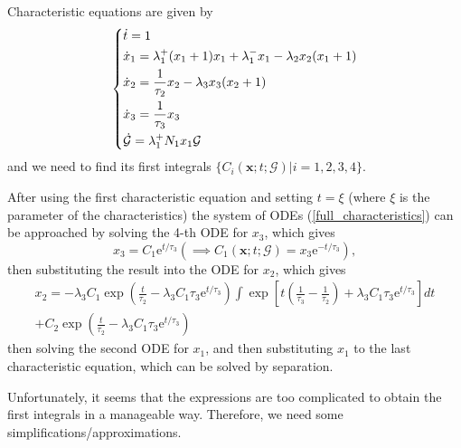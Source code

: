 \documentclass[a4paper, 11pt]{article}
\begin{document}
Characteristic equations are given by
\begin{equation} \label{full_characteristics}
  \begin{dcases}
    \dot t = 1\\
    \dot x_1 = \lambda_1^+(x_1+1)x_1 + \lambda_1^-x_1 - \lambda_2x_2(x_1+1)\\
    \dot x_2 = \frac{1}{\tau_2}x_2 - \lambda_3x_3(x_2+1)\\
    \dot x_3 = \frac{1}{\tau_3}x_3\\
    \dot {\mathcal G} = \lambda_1^+N_1x_1\mathcal G
  \end{dcases}
\end{equation}
and we need to find its first integrals $\{C_i(\mathbf x; t; \mathcal G)|i=1,2,3,4\}$.

After using the first characteristic equation and setting $t = \xi$ (where $\xi$ is the parameter of the characteristics) the system of ODEs (\ref{full_characteristics}) can be approached by solving the 4-th ODE for $x_3$, which gives
\begin{equation*}
  x_3 = C_1\mathrm e^{t/\tau_3} \left(\implies C_1(\mathbf x; t; \mathcal G) = x_3\mathrm e^{-t/\tau_3}\right),
\end{equation*}
then substituting the result into the ODE for $x_2$, which gives
\begin{equation*}
  \begin{split}
    x_2 = -\lambda_3C_1\exp\left(\frac{t}{\tau_2}-\lambda_3C_1\tau_3\mathrm e^{t/\tau_3}\right)\int\exp\left[t\left(\frac{1}{\tau_3} - \frac{1}{\tau_2}\right) + \lambda_3C_1\tau_3\mathrm e^{t/\tau_3}\right]dt\\ + C_2\exp\left(\frac{t}{\tau_2}-\lambda_3C_1\tau_3\mathrm e^{t/\tau_3}\right)
  \end{split}
\end{equation*}
then solving the second ODE for $x_1$, and then substituting $x_1$ to the last characteristic equation, which can be solved by separation.

Unfortunately, it seems that the expressions are too complicated to obtain the first integrals in a manageable way. Therefore, we need some simplifications/approximations.
\end{document}
